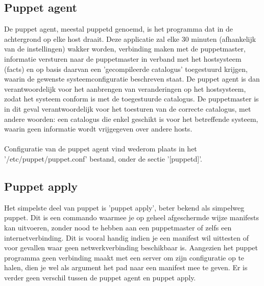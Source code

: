 \subsection{Puppet agent}
De puppet agent, meestal puppetd genoemd, is het programma dat in de achtergrond op elke host draait. Deze applicatie zal elke 30 minuten (afhankelijk van de instellingen) wakker worden, verbinding maken met de puppetmaster, informatie versturen naar de puppetmaster in verband met het hostsysteem (facts) en op basis daarvan een 'gecompileerde catalogus' toegestuurd krijgen, waarin de gewenste systeemconfiguratie beschreven staat. De puppet agent is dan verantwoordelijk voor het aanbrengen van veranderingen op het hostsysteem, zodat het systeem conform is met de toegestuurde catalogus. De puppetmaster is in dit geval verantwoordelijk voor het toesturen van de correcte catalogus, met andere woorden: een catalogus die enkel geschikt is voor het betreffende systeem, waarin geen informatie wordt vrijgegeven over andere hosts.\\\\
Configuratie van de puppet agent vind wederom plaats in het '/etc/puppet/puppet.conf' bestand, onder de sectie '[puppetd]'.

\subsection{Puppet apply}
Het simpelste deel van puppet is 'puppet apply', beter bekend als simpelweg puppet. Dit is een commando waarmee je op geheel afgeschermde wijze manifests kan uitvoeren, zonder nood te hebben aan een puppetmaster of zelfs een internetverbinding. Dit is vooral handig indien je een manifest wil uittesten of voor gevallen waar geen netwerkverbinding beschikbaar is. Aangezien het puppet programma geen verbinding maakt met een server om zijn configuratie op te halen, dien je wel als argument het pad naar een manifest mee te geven. Er is verder geen verschil tussen de puppet agent en puppet apply.

